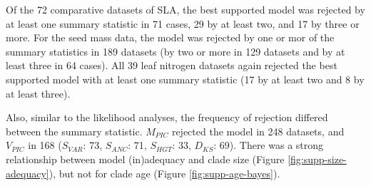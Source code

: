 \documentclass[a4paper,12pt]{article}
\begin{document}
Of the 72 comparative datasets of SLA, the best supported model was rejected by at least one summary statistic in 71 cases, 29 by at least two, and 17 by three or more.
For the seed mass data, the model was rejected by one or mor of the summary statistics in 189 datasets (by two or more in 129 datasets and by at least three in 64 cases).
All 39 leaf nitrogen datasets again rejected the best supported model with at least one summary statistic (17 by at least two and 8 by at least three).

Also, similar to the likelihood analyses, the frequency of rejection differed between the summary statistic. $M_{PIC}$ rejected the model in 248 datasets, and $V_{PIC}$ in 168 ($S_{VAR}$: 73, $S_{ANC}$: 71, $S_{HGT}$: 33, $D_{KS}$: 69). There was a strong relationship between model (in)adequacy and clade size (Figure \ref{fig:supp-size-adequacy}), but not for clade age (Figure \ref{fig:supp-age-bayes}).
 

\newpage


\end{document}
